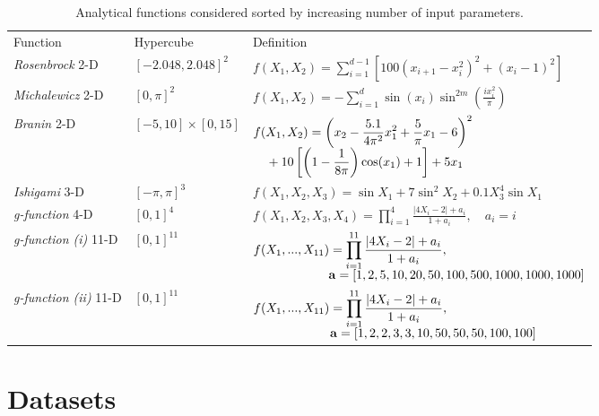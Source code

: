 \begin{table}[ht]
\centering
\setcellgapes{5pt}
\makegapedcells
\begin{tabular}{lll}
\toprule
Function&Hypercube & Definition \\
\cmidrule{1-3}
\textit{Rosenbrock} 2-D& $[-2.048, 2.048]^2$ & $
f(X_1, X_2) = \sum_{i = 1}^{d-1}[100(x_{i+1} - x_i^2)^2  +(x_i -1)^2]$\\
\textit{Michalewicz} 2-D& $[0, \pi]^2$ & $
f(X_1, X_2) = -\sum_{i=1}^d \sin(x_i)\sin^{2m}\left(\frac{ix_i^2}{\pi}\right)$\\
\textit{Branin} 2-D& $[-5, 10] \times [0, 15]$ &
$\begin{multlined}[t][0.6\linewidth]
f(X_1, X_2) = \left( x_2 - \frac{5.1}{4\pi^2}x_1^2 + \frac{5}{\pi}x_1 - 6
              \right)^2\\[-1ex]
+ 10 \left[ \left( 1 - \frac{1}{8\pi} \right) \cos(x_1) + 1 \right] + 5x_1\hfill
\end{multlined}$\\
\textit{Ishigami} 3-D& $[-\pi, \pi]^3$ & $ f(X_1, X_2, X_3) = \sin X_1 + 7 \sin^2 X_2 + 0.1 X_3^4 \sin X_1 $\\
\textit{g-function} 4-D& $[0, 1]^4$ & $
f(X_1, X_2, X_3, X_4) = \prod_{i=1}^4 \frac{\lvert 4X_i - 2\rvert + a_i}{1 + a_i}, \quad a_{i} = i$\\
\textit{g-function (i)} 11-D & $[0, 1]^{11}$ & 
$\begin{multlined}[t][0.6\linewidth]
f(X_1, ..., X_{11}) = \prod_{i=1}^{11} \frac{\lvert 4X_i - 2\rvert + a_i}{1 + a_i},\\[-1ex]
\hspace{50pt} \mathbf{a} = [1, 2, 5, 10, 20, 50, 100, 500, 1000, 1000, 1000]\hfill
\end{multlined}$\\
\textit{g-function (ii)} 11-D & $[0, 1]^{11}$ &
$\begin{multlined}[t][0.6\linewidth]
f(X_1, ..., X_{11}) = \prod_{i=1}^{11} \frac{\lvert 4X_i - 2\rvert + a_i}{1 + a_i},\\[-1ex]
\hspace{51pt} \mathbf{a} = [1, 2, 2, 3, 3, 10, 50, 50, 50, 100, 100]\hfill
\end{multlined}$\\
\bottomrule
\end{tabular}
\caption{Analytical functions considered sorted by increasing number of input parameters.}
\label{tab:functions}
\end{table}

\section{Datasets}
\label{sec:dataset}

